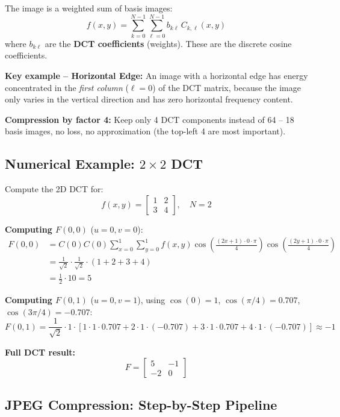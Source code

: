 \documentclass[12pt,a4paper]{article}
\begin{document}
The image is a weighted sum of basis images:
\[
f(x,y) = \sum_{k=0}^{N-1}\sum_{\ell=0}^{N-1}b_{k\ell}\,C_{k,\ell}(x,y)
\]
where $b_{k\ell}$ are the \textbf{DCT coefficients} (weights). These are the discrete cosine coefficients.

\textbf{Key example -- Horizontal Edge:} An image with a horizontal edge has energy concentrated in the \emph{first column} ($\ell=0$) of the DCT matrix, because the image only varies in the vertical direction and has zero horizontal frequency content.

\textbf{Compression by factor 4:} Keep only 4 DCT components instead of 64 -- 18 basis images, no loss, no approximation (the top-left 4 are most important).

\subsection{Numerical Example: $2\times 2$ DCT}

\begin{exbox}
Compute the 2D DCT for:
\[
f(x,y) = \begin{bmatrix} 1 & 2\\ 3 & 4 \end{bmatrix},
\quad N = 2
\]

\textbf{Computing $F(0,0)$} ($u=0, v=0$):
\begin{align*}
F(0,0)
&= C(0)C(0)\sum_{x=0}^{1}\sum_{y=0}^{1}f(x,y)
  \cos\!\left(\frac{(2x+1)\cdot0\cdot\pi}{4}\right)
  \cos\!\left(\frac{(2y+1)\cdot0\cdot\pi}{4}\right)\\
&= \frac{1}{\sqrt{2}}\cdot\frac{1}{\sqrt{2}}\cdot(1+2+3+4)\\
&= \frac{1}{2}\cdot10 = 5
\end{align*}

\textbf{Computing $F(0,1)$} ($u=0, v=1$), using $\cos(0)=1$, $\cos(\pi/4) = 0.707$, $\cos(3\pi/4) = -0.707$:
\[
F(0,1) = \frac{1}{\sqrt{2}}\cdot 1\cdot
[1\cdot1\cdot0.707 + 2\cdot1\cdot(-0.707) + 3\cdot1\cdot0.707 + 4\cdot1\cdot(-0.707)]
\approx -1
\]

\textbf{Full DCT result:}
\[
F = \begin{bmatrix} 5 & -1\\ -2 & 0 \end{bmatrix}
\]
\end{exbox}

\subsection{JPEG Compression: Step-by-Step Pipeline}
\end{document}

